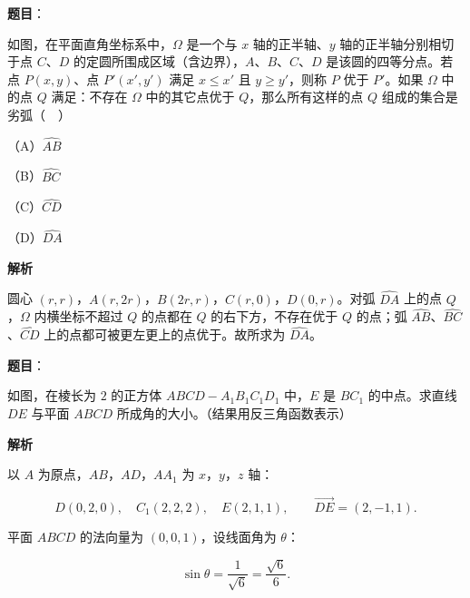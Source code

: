 \begin{answer}

\textbf{题目}：

如图，在平面直角坐标系中，$\Omega$ 是一个与 $x$ 轴的正半轴、$y$ 轴的正半轴分别相切于点 $C$、$D$ 的定圆所围成区域（含边界），$A$、$B$、$C$、$D$ 是该圆的四等分点。若点 $P(x,y)$、点 $P'(x',y')$ 满足 $x\leqslant x'$ 且 $y\geqslant y'$，则称 $P$ 优于 $P'$。如果 $\Omega$ 中的点 $Q$ 满足：不存在 $\Omega$ 中的其它点优于 $Q$，那么所有这样的点 $Q$ 组成的集合是劣弧（　）
\nopagebreak[4]
\begin{center}\end{center}
\nopagebreak[4]
（A）$\widehat{AB}$

（B）$\widehat{BC}$

（C）$\widehat{CD}$

（D）$\widehat{DA}$

\textbf{解析}

圆心 $(r,r)$，$A(r,2r)$，$B(2r,r)$，$C(r,0)$，$D(0,r)$。对弧 $\widehat{DA}$ 上的点 $Q$，$\Omega$ 内横坐标不超过 $Q$ 的点都在 $Q$ 的右下方，不存在优于 $Q$ 的点；弧 $\widehat{AB}$、$\widehat{BC}$、$\widehat{CD}$ 上的点都可被更左更上的点优于。故所求为 $\widehat{DA}$。


\end{answer}
\begin{answer}

\textbf{题目}：

如图，在棱长为 $2$ 的正方体 $ABCD-A_1B_1C_1D_1$ 中，$E$ 是 $BC_1$ 的中点。求直线 $DE$ 与平面 $ABCD$ 所成角的大小。（结果用反三角函数表示）
\nopagebreak[4]
\begin{center}\end{center}
\nopagebreak[4]
\textbf{解析}

以 $A$ 为原点，$AB$，$AD$，$AA_1$ 为 $x$，$y$，$z$ 轴：

\nopagebreak[4]
\[D(0,2,0),\quad C_1(2,2,2),\quad E(2,1,1),\qquad \overrightarrow{DE}=(2,-1,1).\]

平面 $ABCD$ 的法向量为 $(0,0,1)$，设线面角为 $\theta$：

\nopagebreak[4]
\[\sin\theta=\frac{1}{\sqrt6}=\frac{\sqrt6}6.\]


\end{answer}
